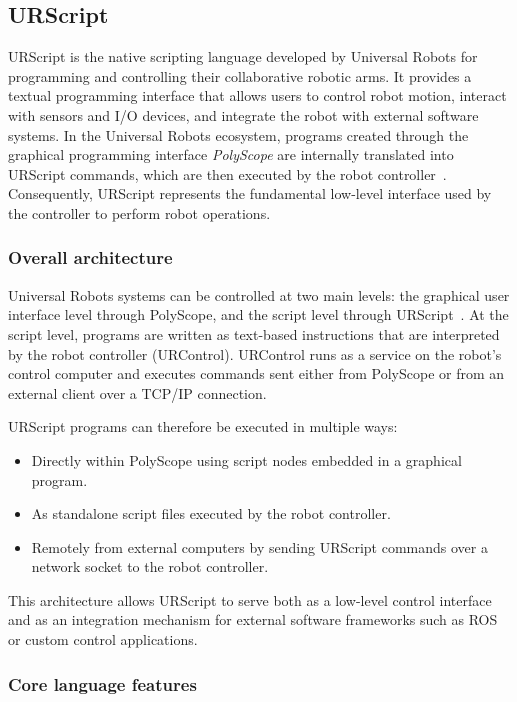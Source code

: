 \documentclass[12pt]{extarticle}
\begin{document}
\subsection{URScript}

URScript is the native scripting language developed by Universal Robots for programming and controlling their collaborative robotic arms. It provides a textual programming interface that allows users to control robot motion, interact with sensors and I/O devices, and integrate the robot with external software systems. In the Universal Robots ecosystem, programs created through the graphical programming interface \textit{PolyScope} are internally translated into URScript commands, which are then executed by the robot controller~\cite{urscript-docs}. Consequently, URScript represents the fundamental low-level interface used by the controller to perform robot operations.

\subsubsection*{Overall architecture}

Universal Robots systems can be controlled at two main levels: the graphical user interface level through PolyScope, and the script level through URScript~\cite{urscript-manual}. At the script level, programs are written as text-based instructions that are interpreted by the robot controller (URControl). URControl runs as a service on the robot's control computer and executes commands sent either from PolyScope or from an external client over a TCP/IP connection.

URScript programs can therefore be executed in multiple ways:
\begin{itemize}
\item Directly within PolyScope using script nodes embedded in a graphical program.
\item As standalone script files executed by the robot controller.
\item Remotely from external computers by sending URScript commands over a network socket to the robot controller.
\end{itemize}

This architecture allows URScript to serve both as a low-level control interface and as an integration mechanism for external software frameworks such as ROS or custom control applications.

\subsubsection*{Core language features}
\end{document}
